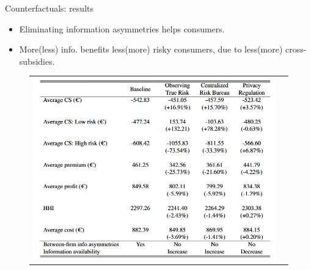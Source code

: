 \documentclass[10pt,aspectratio=169]{beamer}
\begin{document}
\begin{frame}{Counterfactuals: results}
\begin{itemize}
  \item Eliminating information asymmetries helps consumers.  
  \item More(less) info. benefits less(more) risky consumers, due to less(more) cross-subsidies. 
 \end{itemize}
\begin{figure}[H]
\centering{}%
\begin{tabular}{cc}
\includegraphics[scale=0.57]{Figures/Tab5.png}
\end{tabular}
\end{figure}
\end{frame}
\end{document}

